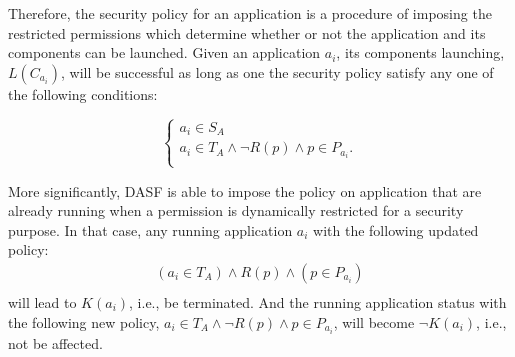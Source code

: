 Therefore, the security policy for an application is a procedure of
imposing the restricted permissions which determine whether or not the
application and its components can be launched. Given an application
$a_i$, its components launching, $L(C_{a_i})$, will be
successful as long as one the security policy satisfy any one of the
following conditions:

\[\left\{
\begin{array}{l}
a_i \in S_A\\
a_i \in T_{A} \wedge \lnot R\left(p\right) \wedge p \in P_{a_{i}}.\\
\end{array}
\right.
\]






\begin{comment}
$a_{i} \in T_{A} \wedge R\left(p\right) \wedge p \in P_{a_{i}} \wedge a_{i} \neq a_{j} \to \lnot L\left(C_{a_{i}}\right)$
\end{comment}
More significantly, DASF is able to impose the
policy on application that are already running when a permission is
dynamically restricted for a security purpose.  In that case, any
running application $a_i$ with the following updated policy:
\[\left.
\begin{array}{l}
(a_{i} \in T_{A}) \wedge R\left(p\right) \wedge (p \in P_{a_{i}})\\
\end{array}
\right.
\]
will lead to $K(a_i)$, i.e., be terminated.  And the running
application status with the following
new policy, $ a_{i} \in T_{A} \wedge \lnot R\left(p\right) \wedge p \in P_{a_{i}}$,
will become $\lnot K(a_i)$, i.e., not be affected.

